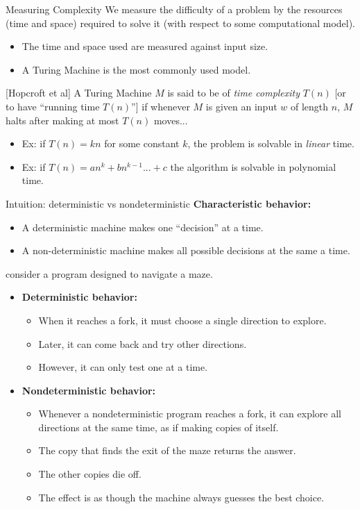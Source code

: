 \documentclass[style=sailor,size=12pt]{powerdot}
\begin{document}
\begin{wideslide}[bm=,toc=]{Measuring Complexity}
We measure the difficulty of a problem by the resources (time and space)
  required to solve it (with respect to some computational model).
\begin{itemize}
\item The time and space used are measured against input size.
\item A Turing Machine is the most commonly used model. 
\end{itemize}
\begin{defn}{}[Hopcroft et al]
A Turing Machine $M$ is said to be of \emph{time complexity} $T(n)$ [or to have
``running time $T(n)$''] if whenever $M$ is given an input $w$ of length
$n$, $M$ halts after making at most $T(n)$ moves...
\end{defn}
\begin{itemize}
\item Ex: if $T(n) = kn$ for some constant $k$, the problem is solvable in
\emph{linear} time.
\item Ex: if $T(n) = an^k + bn^{k-1}... + c$ the algorithm is solvable in polynomial
time.
\end{itemize}
\end{wideslide}

\begin{wideslide}[bm=,toc=]{Intuition: deterministic vs nondeterministic}
{\bf Characteristic behavior:} 
\begin{itemize}
\item<2-> A deterministic machine makes one ``decision'' at a time.
\item<3-> A non-deterministic machine makes all possible decisions at the same a time.
\end{itemize}
 consider a program designed to navigate a maze. 
\begin{itemize}
\item<5-> {\bf Deterministic behavior:} 
\begin{itemize}
\item<6-> When it reaches a fork, it must choose a single direction to explore.
\item<7-> Later, it can come back and try other directions. 
\item<8-> However, it can only test one at a time.
\end{itemize}
\item<9-> {\bf Nondeterministic behavior:}
\begin{itemize}
\item<10-> Whenever a nondeterministic program reaches a fork, it can explore all
directions at the same time, as if making copies of itself. 
\item<11-> The copy that finds the exit of the maze returns the answer.
\item<12-> The other copies die off. 
\item<13-> The effect is as though the machine always guesses the best choice.
\end{itemize}
\end{itemize}

\end{wideslide}
\end{document}
